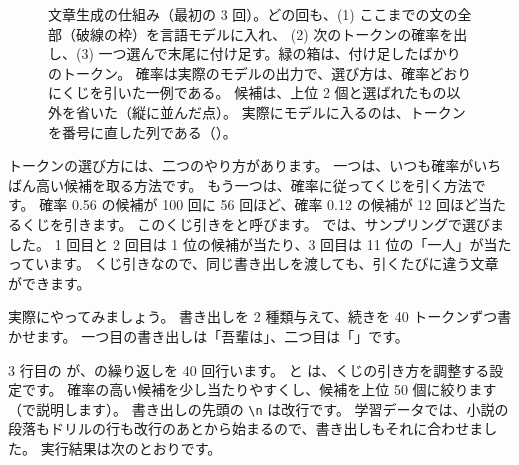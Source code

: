\begin{figure}[tbp]
\caption{文章生成の仕組み（最初の 3 回）。どの回も、(1) ここまでの文の全部（破線の枠）を言語モデルに入れ、
(2) 次のトークンの確率を出し、(3) 一つ選んで末尾に付け足す。緑の箱は、付け足したばかりのトークン。
確率は実際のモデルの出力で、選び方は、確率どおりにくじを引いた一例である。
候補は、上位 2 個と選ばれたもの以外を省いた（縦に並んだ点）。
実際にモデルに入るのは、トークンを番号に直した列である（）。}
\label{fig:intro-loop}
\end{figure}

トークンの選び方には、二つのやり方があります。
一つは、いつも確率がいちばん高い候補を取る方法です。
もう一つは、確率に従ってくじを引く方法です。
確率 0.56 の候補が 100 回に 56 回ほど、確率 0.12 の候補が 12 回ほど当たるくじを引きます。
このくじ引きをと呼びます。
では、サンプリングで選びました。
1 回目と 2 回目は 1 位の候補が当たり、3 回目は 11 位の「一人」が当たっています。
くじ引きなので、同じ書き出しを渡しても、引くたびに違う文章ができます。

実際にやってみましょう。
書き出しを 2 種類与えて、続きを 40 トークンずつ書かせます。
一つ目の書き出しは「吾輩は」、二つ目は「」です。


3 行目の  が、の繰り返しを 40 回行います。
 と  は、くじの引き方を調整する設定です。
確率の高い候補を少し当たりやすくし、候補を上位 50 個に絞ります（で説明します）。
書き出しの先頭の \texttt{\textbackslash n} は改行です。
学習データでは、小説の段落もドリルの行も改行のあとから始まるので、書き出しもそれに合わせました。
実行結果は次のとおりです。


